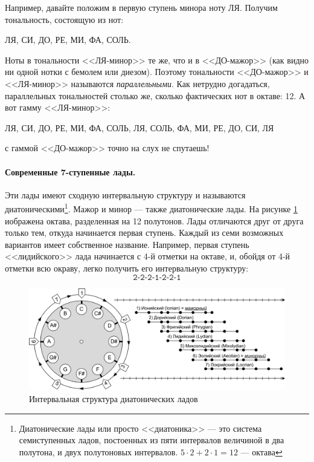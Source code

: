 Например, давайте положим в первую ступень минора ноту ЛЯ. Получим тональность, состоящую из нот:
\begin{center}
    ЛЯ, СИ, ДО, РЕ, МИ, ФА, СОЛЬ.
\end{center}

Ноты в тональности <<ЛЯ-минор>> те же, что и в <<ДО-мажор>> (как видно ни одной нотки с бемолем или диезом). Поэтому тональности <<ДО-мажор>> и <<ЛЯ-минор>> называются \emph{параллельными}. Как нетрудно догадаться, параллельных тональностей столько же, сколько фактических нот в октаве: 12. А вот гамму <<ЛЯ-минор>>:
\begin{center}
    ЛЯ, СИ, ДО, РЕ, МИ, ФА, СОЛЬ, ЛЯ, СОЛЬ, ФА, МИ, РЕ, ДО, СИ, ЛЯ
\end{center}
с гаммой <<ДО-мажор>> точно на слух не спутаешь!

\paragraph{Современные 7-ступенные лады.} Эти лады имеют сходную интервальную структуру и называются диатоническими\footnote{Диатонические лады или просто <<диатоника>> --- это система семиступенных ладов, постоенных из пяти интервалов величиной в два полутона, и двух полутоновых интервалов. $5\cdot2 + 2\cdot 1 = 12$ --- октава}. Мажор и минор --- также диатонические лады. На рисунке \ref{fig:harmony:lad:modes} иображена октава, разделенная на 12 полутонов. Лады отличаются друг от друга только тем, откуда начинается первая ступень. Каждый из семи возможных вариантов имеет собственное название. Например, первая ступень <<лидийского>> лада начинается с 4-й отметки на октаве, и, обойдя от 4-й отметки всю окраву, легко получить его интервальную структуру:
\[
    \texttt{2-2-2-1-2-2-1}
\]

\begin{figure}[!ht]
    \centering
    \includegraphics[width=\textwidth]{fig/intervals/modes} 
    \caption{Интервальная структура диатонических ладов}\label{fig:harmony:lad:modes}
\end{figure} 

